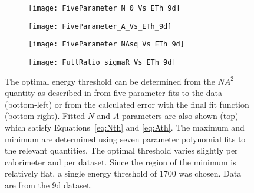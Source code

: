 \begin{figure}
\centering
    \begin{subfigure}[t]{0.45\textwidth}
        \centering
        \texttt{[image: FiveParameter\_N\_0\_Vs\_ETh\_9d]}
    \end{subfigure}
     \begin{subfigure}[t]{0.45\textwidth}
        \centering
        \texttt{[image: FiveParameter\_A\_Vs\_ETh\_9d]}
    \end{subfigure}
       
    \begin{subfigure}[t]{0.45\textwidth}
        \centering
        \texttt{[image: FiveParameter\_NAsq\_Vs\_ETh\_9d]}
    \end{subfigure}
    \begin{subfigure}[t]{0.45\textwidth}
        \centering
        \texttt{[image: FullRatio\_sigmaR\_Vs\_ETh\_9d]}
    \end{subfigure}%
\caption[Determination of optimal energy threshold]{The optimal energy threshold can be determined from the $NA^{2}$ quantity as described in  from five parameter fits to the data (bottom-left) or from the calculated error with the final fit function (bottom-right). Fitted $N$ and $A$ parameters are also shown (top) which satisfy Equations~\ref{eq:Nth} and \ref{eq:Ath}. The maximum and minimum are determined using seven parameter polynomial fits to the relevant quantities. The optimal threshold varies slightly per calorimeter and per dataset. Since the region of the minimum is relatively flat, a single energy threshold of 1700 \MeV was chosen. Data are from the 9d dataset.}
\label{fig:OptimalEnergyThreshold}
\end{figure}



